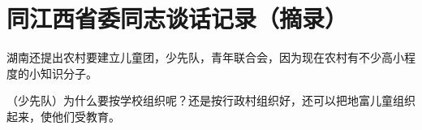 \section[同江西省委同志谈话记录（摘录）（一九六四年）]{同江西省委同志谈话记录（摘录）}


湖南还提出农村要建立儿童团，少先队，青年联合会，因为现在农村有不少高小程度的小知识分子。

（少先队）为什么要按学校组织呢？还是按行政村组织好，还可以把地富儿童组织起来，使他们受教育。



